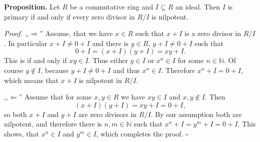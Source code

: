 \documentclass[12pt]{article}
\begin{document}
\textbf{Proposition.} Let $R$ be a commutative ring and $I\subseteq R$ an ideal. Then $I$ is primary if and only if every zero divisor in $R/I$ is nilpotent.

\textit{Proof.} ,,$\Rightarrow$'' Assume, that we have $x\in R$ such that $x+I$ is a zero divisor in $R/I$. In particular $x+I\neq 0+I$ and there is $y\in R$, $y+I\neq 0+I$ such that
$$0+I=(x+I)(y+I)=xy+I.$$
This is if and only if $xy\in I$. Thus either $y\in I$ or $x^n\in I$ for some $n\in\mathbb{N}$. Of course $y\not\in I$, because $y+I\neq 0+I$ and thus $x^n\in I$. Therefore $x^n+I=0+I$, which means that $x+I$ is nilpotent in $R/I$.

,,$\Leftarrow$'' Assume that for some $x,y\in R$ we have $xy\in I$ and $x,y\not\in I$. Then
$$(x+I)(y+I)=xy+I=0+I,$$
so both $x+I$ and $y+I$ are zero divisors in $R/I$. By our assumption both are nilpotent, and therefore there is $n,m\in\mathbb{N}$ such that $x^n+I=y^m+I=0+I$. This shows, that $x^n\in I$ and $y^m\in I$, which completes the proof. $\square$
\end{document}

